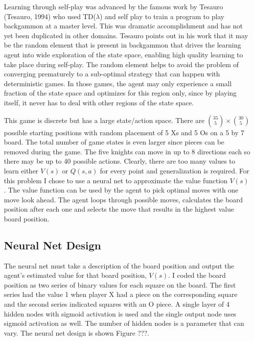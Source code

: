 \documentclass[11pt]{article} %
\begin{document}
\begin{flushleft}
Learning through self-play was advanced by the famous work by Tesauro (Tesauro, 1994) who used TD($\lambda$) and self play to train a program to play backgammon at a master level.  This was dramatic accomplishment and has not yet been duplicated in other domains.  Tesauro points out in his work that it may be the random element that is present in backgammon that drives the learning agent into wide exploration of the state space, enabling high quality learning to take place during self-play.  The random element helps to avoid the problem of converging prematurely to a sub-optimal strategy that can happen with deterministic games.  In those games, the agent may only experience a small fraction of the state space and optimizes for this region only, since by playing itself, it never has to deal with other regions of the state space.

This game is discrete but has a large state/action space.  There are ${35 \choose 5} \times {30 \choose 5}$ possible starting positions with random placement of 5 Xs and 5 Os on a 5 by 7 board.  The total number of game states is even larger since pieces can be removed during the game.  The five knights can move in up to 8 directions each so there may be up to 40 possible actions.  Clearly, there are too many values to learn either $V(s)$ or $Q(s,a)$ for every point and generalization is required.  For this problem I chose to use a neural net to approximate the value function $V(s)$.  The value function can be used by the agent to pick optimal moves with one move look ahead.  The agent loops through possible moves, calculates the board position after each one and selects the move that results in the highest value board position.

\subsection{Neural Net Design}
The neural net must take a description of the board position and output the agent’s estimated value for that board position, $V(s)$.  I coded the board position as two series of binary values for each square on the board.  The first series had the value 1 when player X had a piece on the corresponding square and the second series indicated squares with an O piece.  A single layer of 4 hidden nodes with sigmoid activation is used and the single output node uses sigmoid activation as well.  The number of hidden nodes is a parameter that can vary.  The neural net design is shown Figure ???.

\end{flushleft}
\end{document}

